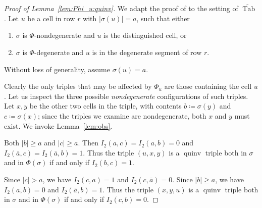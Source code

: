 \documentclass[ALCO,Unicode]{cedram}
\DeclareMathOperator{\PQT}{Tab}
\DeclareMathOperator{\quinv}{quinv}
\newcommand\cellL[4]{
\def\i{#1} \def\j{#2} \def\entry{#3} \def\labl{#4}
\draw (\j-1,-\i)--(\j,-\i)--(\j,-\i+1)--(\j-1,-\i+1)--(\j-1,-\i);
\node at (\j-.5,-\i+.5) {\entry};
\node at (\j-1.3,-\i+.8) {\tiny\labl};
}
\begin{document}
\begin{proof}[Proof of Lemma~\ref{lem:Phi_u:quinv}]
We adapt the proof of \cite[Lemma 5.2]{HHL05} to the setting of $\widetilde{\PQT}$.  Let $u$ be a cell in row $r$ with $|\sigma(u)|=a$, such that either
\begin{enumerate}
\item $\sigma$ is $\Phi$-nondegenerate and $u$ is the distinguished cell, or
\item $\sigma$ is $\Phi$-degenerate and $u$ is in the degenerate segment of row $r$. 
\end{enumerate}
Without loss of generality, assume $\sigma(u)=a$. 

Clearly the only triples that may be affected by $\Phi_u$ are those containing the cell $u$. Let us inspect the three possible \emph{nondegenerate} configurations of such triples. Let $x,y$ be the other two cells in the triple, with contents $b\coloneqq\sigma(y)$ and $c\coloneqq\sigma(x)$; since the triples we examine are nondegenerate, both $x$ and $y$ must exist. We invoke Lemma~\ref{lem:obs}.
\begin{flushleft}
\end{flushleft}
Both $|b|\geq a$ and $|c|\geq a$. Then $I_2(a,c)=I_2(a,b)=0$ and $I_2(\bar{a},c)=I_2(\bar{a},b)=1$. Thus the triple $(u,x,y)$ is a $\quinv$ triple both in $\sigma$ and in $\Phi(\sigma)$ if and only if $I_2(b,c)=1$.
\begin{flushleft}
\end{flushleft}
Since $|c|>a$, we have $I_2(c,a)=1$ and $I_2(c,\bar{a})=0$. Since $|b|\geq a$, we have $I_2(a,b)=0$ and $I_2(\bar{a},b)=1$. Thus the triple $(x,y,u)$ is a $\quinv$ triple both in $\sigma$ and in $\Phi(\sigma)$ if and only if $I_2(c,b)=0$.

\end{proof}
\end{document}

